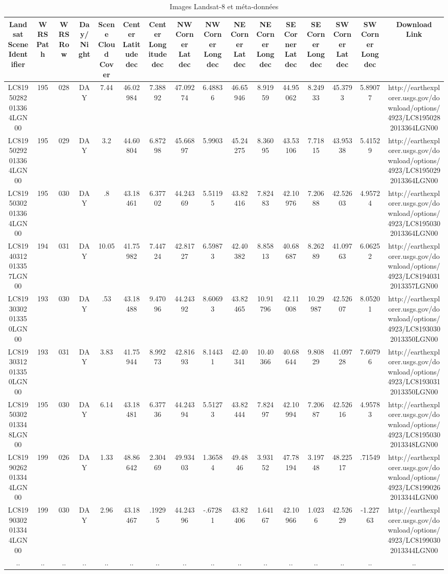 \documentclass{book}
\begin{document}
\begin{table}
\begin{center}
\begin{adjustbox}{max width=\textwidth}
\begin{tabular}{|c|c|c|c|c|c|c|c|c|c|c|c|c|c|c|c|}
\hline
Landsat Scene Identifier&WRS Path&WRS Row&Day/Night&Scene Cloud Cover&Center Latitude dec&Center Longitude dec&NW Corner Lat dec&NW Corner Long dec&NE Corner Lat dec&NE Corner Long dec&SE Corner Lat dec&SE Corner Long dec&SW Corner Lat dec&SW Corner Long dec&Download Link\\
\hline
LC81950282013364LGN00& 195& 028&DAY&7.44&46.02984&7.38892&47.09274&6.48836&46.65946&8.91959&44.95062&8.24933&45.3793&5.89077&http://earthexplorer.usgs.gov/download/options/4923/LC81950282013364LGN00\\
\hline
LC81950292013364LGN00& 195& 029&DAY&3.2&44.60804&6.87298&45.66897&5.9903&45.24275&8.36095&43.53106&7.71815&43.95338&5.41529&http://earthexplorer.usgs.gov/download/options/4923/LC81950292013364LGN00\\
\hline
LC81950302013364LGN00& 195& 030&DAY&.8&43.18461&6.37702&44.24369&5.51195&43.82416&7.82483&42.10976&7.20688&42.52603&4.95724&http://earthexplorer.usgs.gov/download/options/4923/LC81950302013364LGN00\\
\hline
LC81940312013357LGN00& 194& 031&DAY&10.05&41.75982&7.44724&42.81727&6.59873&42.40382&8.85813&40.68687&8.26289&41.09763&6.06252&http://earthexplorer.usgs.gov/download/options/4923/LC81940312013357LGN00\\
\hline
LC81930302013350LGN00& 193& 030&DAY&.53&43.18488&9.47096&44.24392&8.60693&43.82465&10.91796&42.11008&10.29987&42.52607&8.05201&http://earthexplorer.usgs.gov/download/options/4923/LC81930302013350LGN00\\
\hline
LC81930312013350LGN00& 193& 031&DAY&3.83&41.75944&8.99273&42.81693&8.14431&42.40341&10.40366&40.68644&9.80829&41.09728&7.60796&http://earthexplorer.usgs.gov/download/options/4923/LC81930312013350LGN00\\
\hline
LC81950302013348LGN00& 195& 030&DAY&6.14&43.18481&6.37736&44.24394&5.51273&43.82444&7.82497&42.10994&7.20687&42.52616&4.95783&http://earthexplorer.usgs.gov/download/options/4923/LC81950302013348LGN00\\
\hline
LC81990262013344LGN00& 199& 026&DAY&1.33&48.86642&2.30469&49.93403&1.36584&49.4846&3.93152&47.78194&3.19748&48.22517&.71549&http://earthexplorer.usgs.gov/download/options/4923/LC81990262013344LGN00\\
\hline
LC81990302013344LGN00& 199& 030&DAY&2.96&43.18467&.19295&44.24396&-.67281&43.82406&1.64167&42.10966&1.0236&42.52629&-1.22763&http://earthexplorer.usgs.gov/download/options/4923/LC81990302013344LGN00\\
\hline
..&..&..&..&..&..&..&..&..&..&..&..&..&..&..&..\\
\hline
\end{tabular}
\end{adjustbox}
\end{center}
\caption{Images Landsat-8 et méta-données}
\label{attributs}
\end{table}
\end{document}
